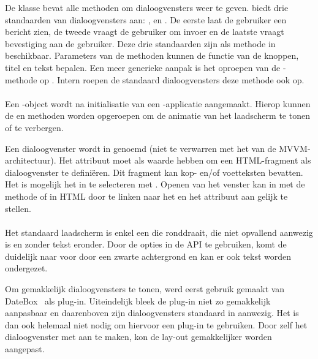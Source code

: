 De   klasse bevat alle methoden om dialoogvensters weer te geven.
\st{} biedt drie standaarden van dialoogvensters aan: ,  en .
De eerste laat de gebruiker een bericht zien,  de tweede vraagt de gebruiker om invoer en de laatste vraagt bevestiging aan de gebruiker.
Deze drie standaarden zijn als methode in  beschikbaar.
Parameters van de methoden kunnen de functie van de knoppen, titel en tekst bepalen.
Een meer generieke aanpak is het oproepen van de -methode op .
Intern roepen de standaard dialoogvensters deze methode ook op.

\paragraph{\kendo}
Een -object wordt na initialisatie van een \kendo{}-applicatie aangemaakt.
Hierop kunnen de  en  methoden worden opgeroepen om de animatie van het laadscherm te tonen of te verbergen.

Een dialoogvenster wordt in \kendo{}  genoemd (niet te verwarren met het  van de MVVM-architectuur).
Het attribuut  moet  als waarde hebben om een HTML-fragment als dialoogvenster te definiëren.
Dit fragment kan kop- en/of voetteksten bevatten.
Het is mogelijk het  in \js{} te selecteren met .
Openen van het venster kan in \js{} met de  methode of in HTML door te linken naar het  en het  attribuut aan  gelijk te stellen.

\paragraph{\jqm}
Het standaard laadscherm is enkel een  die ronddraait, die niet opvallend aanwezig is en zonder tekst eronder.
Door de opties in de API te gebruiken, komt de  duidelijk naar voor door een zwarte achtergrond en kan er ook tekst worden ondergezet.

Om gemakkelijk dialoogvensters te tonen, werd eerst gebruik gemaakt van DateBox~\cite{Sage2013} als plug-in.
Uiteindelijk bleek de plug-in niet zo gemakkelijk aanpasbaar en daarenboven zijn dialoogvensters standaard in \jqm{} aanwezig.
Het is dan ook helemaal niet nodig om hiervoor een plug-in te gebruiken.
Door zelf het dialoogvenster met \jqm{} aan te maken, kon de lay-out gemakkelijker worden aangepast.

